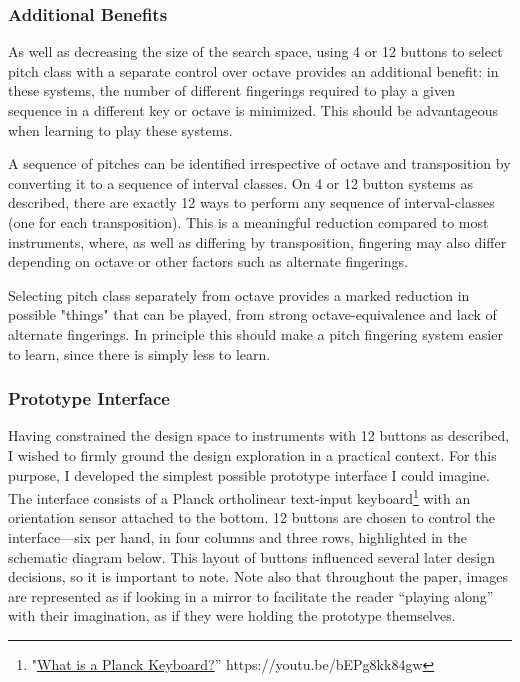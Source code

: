 \documentclass[sigconf]{nimeart}
\begin{document}
\subsubsection{Additional Benefits}\label{additional-benefits}

As well as decreasing the size of the search space, using 4 or 12 buttons to select pitch class with a separate control over octave provides an additional benefit: in these systems, the number of different fingerings required to play a given sequence in a different key or octave is minimized. This should be advantageous when learning to play these systems.

A sequence of pitches can be identified irrespective of octave and transposition by converting it to a sequence of interval classes. On 4 or 12 button systems as described, there are exactly 12 ways to perform any sequence of interval-classes (one for each transposition). This is a meaningful reduction compared to most instruments, where, as well as differing by transposition, fingering may also differ depending on octave or other factors such as alternate fingerings.

Selecting pitch class separately from octave provides a marked reduction in possible "things" that can be played, from strong octave-equivalence and lack of alternate fingerings. In principle this should make a pitch fingering system easier to learn, since there is simply less to learn.

\subsubsection{Prototype Interface}\label{prototype-interface}

Having constrained the design space to instruments with 12 buttons as described, I wished to firmly ground the design exploration in a practical context. For this purpose, I developed the simplest possible prototype interface I could imagine. The interface consists of a Planck ortholinear text-input keyboard\footnote{"\href{https://www.youtube.com/watch?v=bEPg8kk84gw}{What is a Planck Keyboard?}'' https://youtu.be/bEPg8kk84gw} with an orientation sensor attached to the bottom. 12 buttons are chosen to control the interface---six per hand, in four columns and three rows, highlighted in the schematic diagram below. This layout of buttons influenced several later design decisions, so it is important to note. Note also that throughout the paper, images are represented as if looking in a mirror to facilitate the reader ``playing along'' with their imagination, as if they were holding the prototype themselves.
\end{document}
